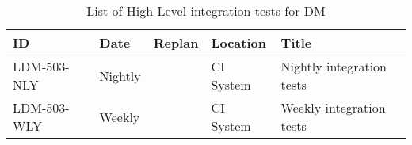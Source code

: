 \begin{longtable} {llllp{}}
\caption{List of High Level integration tests for DM \label{tab:schedule}} \\ %
\toprule
\textbf{ID} & \textbf{Date} & \textbf{Replan} & \textbf{Location} & \textbf{Title} \\ \toprule

LDM-503-NLY &
Nightly &
	&
CI System &
Nightly integration tests \\

LDM-503-WLY &
Weekly &
	&
CI System &
Weekly integration tests \\



\end{longtable}
